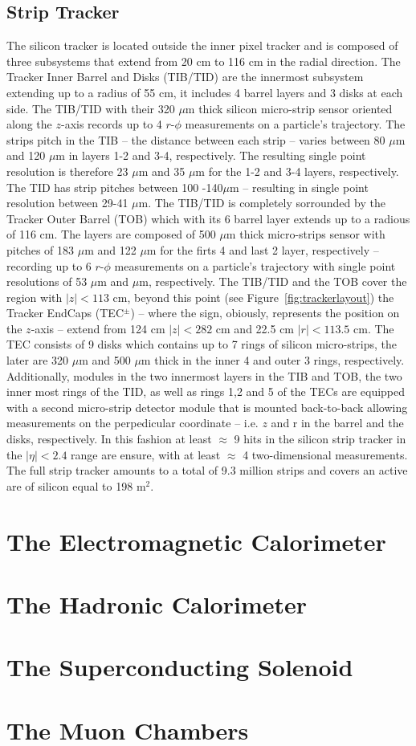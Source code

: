 \subsection{Strip Tracker}
The silicon tracker is located outside the inner pixel tracker and is
composed of three subsystems that extend from 20 cm to 116 cm in the
radial direction. The Tracker Inner Barrel and Disks (TIB/TID) are
the innermost subsystem extending up to a radius of 55 cm, it includes
4 barrel layers and 3 disks at each side. The TIB/TID with their 320
$\mu$m thick silicon micro-strip sensor oriented along the $z$-axis records up to 4 $r$-$\phi$
measurements on a particle's trajectory. The strips pitch  in the TIB -- the
distance between each strip -- varies between 80 $\mu$m and 120 $\mu$m
in layers 1-2 and 3-4, respectively. The resulting single point
resolution is therefore 23 $\mu$m and 35 $\mu$m for the 1-2 and 3-4
layers, respectively. The TID has strip pitches between 100 -140$\mu$m
-- resulting in single point resolution between 29-41 $\mu$m. The
TIB/TID is completely sorrounded by the Tracker Outer Barrel (TOB)
which with its 6 barrel layer extends up to a radious of 116 cm. The
layers are composed of 500 $\mu$m thick micro-strips sensor with
pitches of 183 $\mu$m and 122 $\mu$m for the firts 4  and last 2
layer, respectively -- recording up to 6 $r$-$\phi$
measurements on a particle's trajectory with single point resolutions of 53 $\mu$m
and $\mu$m, respectively. The TIB/TID and the TOB cover the region
with $|z|< 113$ cm, beyond this point (see
Figure~\ref{fig:trackerlayout}) the Tracker EndCaps (TEC$^{\pm}$) --
where the sign, obiously, represents the position on the $z$-axis --
extend from 124 cm $|z|< 282$ cm and 22.5 cm $|r|< 113.5$ cm. The TEC
consists of 9 disks which contains up to 7 rings of silicon
micro-strips, the later are 320 $\mu$m and 500 $\mu$m thick in the
inner 4 and outer 3 rings, respectively.
Additionally, modules in the two innermost layers in the TIB and TOB,
the two inner most rings of the TID, as well as rings 1,2 and 5 of the TECs are
equipped with a second micro-strip detector module that is mounted
back-to-back allowing measurements on the perpedicular coordinate --
i.e. $z$ and r in the barrel and the disks, respectively. In this
fashion at least $\approx$ 9 hits in the silicon strip tracker in the
$|\eta|<2.4$ range are ensure, with at least $\approx$ 4
two-dimensional measurements. The full strip tracker amounts to a
total of 9.3 million strips and covers an active are of silicon equal
to 198 m$^2$.

\section{The Electromagnetic Calorimeter}
\section{The Hadronic Calorimeter}
\section{The Superconducting Solenoid}
\section{The Muon Chambers}
